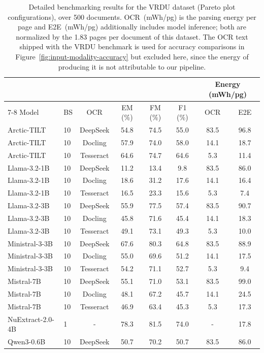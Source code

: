 \begin{table}[ht]
\caption{Detailed benchmarking results for the VRDU dataset (Pareto plot configurations), over 500 documents. OCR~(mWh/pg) is the parsing energy per page and E2E~(mWh/pg) additionally includes model inference; both are normalized by the 1.83 pages per document of this dataset. The OCR text shipped with the VRDU benchmark is used for accuracy comparisons in Figure~\ref{fig:input-modality-accuracy} but excluded here, since the energy of producing it is not attributable to our pipeline.}
\label{tab:vrdu_plot_results}
\begin{tabular}{llcccccc}
\toprule
& & & & & & \multicolumn{2}{c}{Energy (mWh/pg)} \\
\cmidrule(lr){7-8}
Model & BS & OCR & EM (\%) & FM (\%) & F1 (\%) & OCR & E2E \\
\midrule
Arctic-TILT & 10 & DeepSeek & 54.8 & 74.5 & 55.0 & 83.5 & 96.8 \\
Arctic-TILT & 10 & Docling & 57.9 & 74.0 & 58.0 & 14.1 & 18.7 \\
Arctic-TILT & 10 & Tesseract & 64.6 & 74.7 & 64.6 & 5.3 & 11.4 \\
Llama-3.2-1B & 10 & DeepSeek & 11.2 & 13.4 & 9.8 & 83.5 & 86.0 \\
Llama-3.2-1B & 10 & Docling & 18.6 & 31.2 & 17.6 & 14.1 & 16.4 \\
Llama-3.2-1B & 10 & Tesseract & 16.5 & 23.3 & 15.6 & 5.3 & 7.4 \\
Llama-3.2-3B & 10 & DeepSeek & 55.9 & 77.5 & 57.4 & 83.5 & 90.7 \\
Llama-3.2-3B & 10 & Docling & 45.8 & 71.6 & 45.4 & 14.1 & 18.3 \\
Llama-3.2-3B & 10 & Tesseract & 49.1 & 73.1 & 49.3 & 5.3 & 10.0 \\
Ministral-3-3B & 10 & DeepSeek & 67.6 & 80.3 & 64.8 & 83.5 & 88.9 \\
Ministral-3-3B & 10 & Docling & 55.0 & 69.6 & 51.2 & 14.1 & 17.5 \\
Ministral-3-3B & 10 & Tesseract & 54.2 & 71.1 & 52.7 & 5.3 & 9.4 \\
Mistral-7B & 10 & DeepSeek & 55.1 & 71.0 & 53.1 & 83.5 & 99.0 \\
Mistral-7B & 10 & Docling & 48.1 & 67.2 & 45.7 & 14.1 & 24.5 \\
Mistral-7B & 10 & Tesseract & 46.9 & 63.4 & 45.3 & 5.3 & 17.3 \\
NuExtract-2.0-4B & 1 & - & 78.3 & 81.5 & 74.0 & - & 17.8 \\
Qwen3-0.6B & 10 & DeepSeek & 50.7 & 70.2 & 50.7 & 83.5 & 86.0 \\

\end{tabular}
\end{table}
